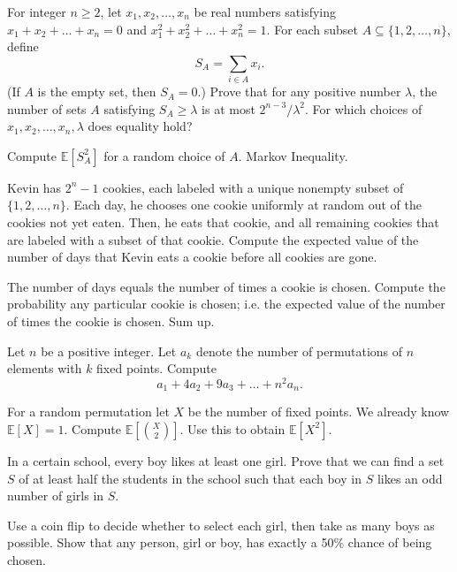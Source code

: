 \documentclass[11pt]{scrartcl}
\newcommand\EE{\mathbb E}
\begin{document}
\begin{problem}
	[USAMO 2012/6] For integer $n\geq2$, let $x_1, x_2, \ldots, x_n$ be real numbers satisfying $x_1+x_2+\ldots+x_n=0$  and $x_1^2+x_2^2+\ldots+x_n^2=1$. For each subset $A\subseteq\{1, 2, \ldots, n\}$, define\[S_A=\sum_{i\in A}x_i.\](If $A$ is the empty set, then $S_A=0$.) Prove that for any positive number $\lambda$, the number of sets $A$ satisfying $S_A\geq\lambda$ is at most $2^{n-3}/\lambda^2$.  For which choices of $x_1, x_2, \ldots, x_n, \lambda$ does equality hold?
	\begin{sketch}
		Compute $\EE[S_A^2]$ for a random choice of $A$.
		Markov Inequality.
	\end{sketch}
\end{problem}


\begin{problem}
	 Kevin has $2^n-1$ cookies, each labeled with a unique nonempty subset of $\{1,2,\dots,n\}$.
	Each day, he chooses one cookie uniformly at random out of the cookies not yet eaten.
	Then, he eats that cookie, and all remaining cookies that are labeled with a subset of that cookie.
	Compute the expected value of the number of days that Kevin eats a cookie before all cookies are gone. %
	\begin{sketch}
		The number of days equals the number of times a cookie is chosen.
		Compute the probability any particular cookie is chosen;
		{i.e.} the expected value of the number of times the cookie is chosen.
		Sum up.
	\end{sketch}
\end{problem}

\begin{problem}
	Let $n$ be a positive integer.
	Let $a_k$ denote the number of permutations of $n$ elements with $k$ fixed points.
	Compute \[ a_1 + 4a_2 + 9a_3 + \dots + n^2a_n. \]
	\begin{sketch}
		For a random permutation let $X$ be the number of fixed points.
		We already know $\EE[X] = 1$.
		Compute $\EE[\binom{X}{2}]$.
		Use this to obtain $\EE[X^2]$.
	\end{sketch}
\end{problem}

\begin{problem}
	[Russia 1999] In a certain school, every boy likes at least one girl.
	Prove that we can find a set $S$ of at least half the students in the school
	such that each boy in $S$ likes an odd number of girls in $S$.
	\begin{sketch}
		Use a coin flip to decide whether to select each girl, then take as many boys as possible.
		Show that any person, girl or boy, has exactly a 50\% chance of being chosen.
	\end{sketch}
\end{problem}
\end{document}

